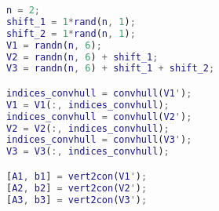 \begin{lstlisting}[language=Matlab]
n = 2;
shift_1 = 1*rand(n, 1);
shift_2 = 1*rand(n, 1);
V1 = randn(n, 6);
V2 = randn(n, 6) + shift_1;
V3 = randn(n, 6) + shift_1 + shift_2;

indices_convhull = convhull(V1');
V1 = V1(:, indices_convhull);
indices_convhull = convhull(V2');
V2 = V2(:, indices_convhull);
indices_convhull = convhull(V3');
V3 = V3(:, indices_convhull);

[A1, b1] = vert2con(V1');
[A2, b2] = vert2con(V2');
[A3, b3] = vert2con(V3');
\end{lstlisting}
